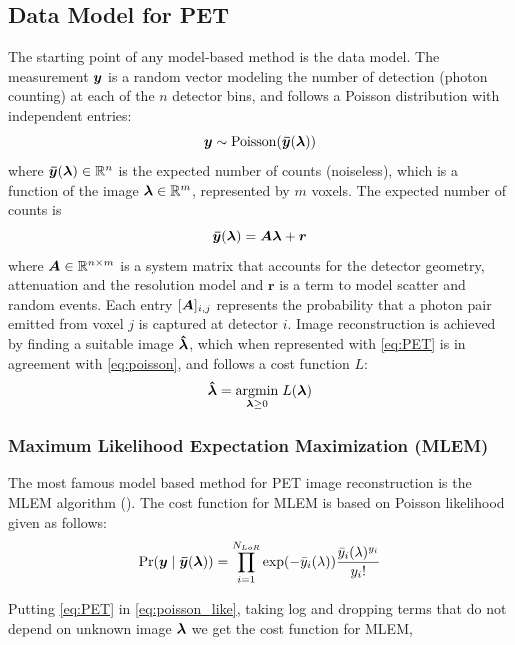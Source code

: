 \subsection{Data Model for PET}
The starting point of any model-based method is the data model. The measurement $\bm{y}$ is a random vector modeling the number of detection (photon counting) at each of the $n$ detector bins, and follows a Poisson distribution with independent entries:
\begin{equation}\label{eq:poisson}
\bm{y} \sim \mathrm{Poisson}(\bm{\bar{y}}(\bm{\lambda}))
\end{equation}    
where $\bm{\bar{y}}(\bm{\lambda}) \in \mathbb{R}^n$ is the expected number of counts (noiseless), which is a function of the image $\bm{\lambda} \in \mathbb{R}^m$, represented by $m$ voxels. The expected number of counts is
\begin{equation}\label{eq:PET}
\bm{\bar{y}}(\bm{\lambda}) = \bm{A} \bm{\lambda} + \bm{r}
\end{equation}
where $\bm{A} \in \mathbb{R}^{n\times m}$ is a system matrix that accounts for the detector geometry, attenuation and the resolution model and $\bm{r}$ is a term to model scatter and random events. Each entry $[\bm{A}]_{i,j}$ represents the probability that a photon pair emitted from voxel $j$ is captured at detector $i$. Image reconstruction is achieved by finding a suitable image $\bm{\hat{\lambda}}$, which when represented with \ref{eq:PET} is in agreement with \ref{eq:poisson}, and follows a cost function $L$:
\begin{equation}
\bm{\hat{\lambda}}=\underset{\bm{\lambda} \ge 0}{\operatorname{argmin}} \; L(\bm{\lambda})
\end{equation}

\subsubsection{Maximum Likelihood Expectation Maximization (MLEM)}
The most famous model based method for \ac{PET} image reconstruction is the \ac{MLEM} algorithm (\cite{shepp1982maximum}). The cost function for \ac{MLEM} is based on Poisson likelihood given as follows:
\begin{equation}\label{eq:poisson_like}
\operatorname{Pr}(\bm{y} \mid \bm{\bar{y}}(\bm{\lambda}))=\prod_{i=1}^{N_{L o R}} \exp (-\bar{y}_{i}(\lambda)) \frac{\bar{y}_{i}(\lambda)^{y_{i}}}{y_{i} !} 
\end{equation}

Putting \ref{eq:PET} in \ref{eq:poisson_like}, taking log and dropping terms that do not depend on unknown image $\bm{\lambda}$ we get the cost function for \ac{MLEM},

